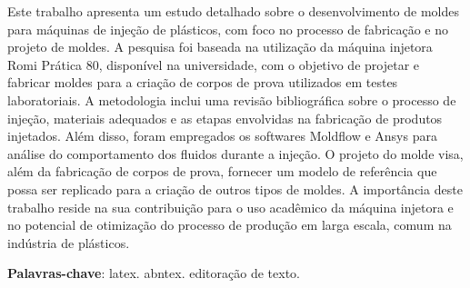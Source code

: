 \begin{resumo}
    Este trabalho apresenta um estudo detalhado sobre o desenvolvimento de moldes para máquinas de injeção de plásticos, com foco no processo de fabricação e no projeto de moldes. A pesquisa foi baseada na utilização da máquina injetora Romi Prática 80, disponível na universidade, com o objetivo de projetar e fabricar moldes para a criação de corpos de prova utilizados em testes laboratoriais. A metodologia inclui uma revisão bibliográfica sobre o processo de injeção, materiais adequados e as etapas envolvidas na fabricação de produtos injetados. Além disso, foram empregados os softwares Moldflow e Ansys para análise do comportamento dos fluidos durante a injeção. O projeto do molde visa, além da fabricação de corpos de prova, fornecer um modelo de referência que possa ser replicado para a criação de outros tipos de moldes. A importância deste trabalho reside na sua contribuição para o uso acadêmico da máquina injetora e no potencial de otimização do processo de produção em larga escala, comum na indústria de plásticos.

 \vspace{\onelineskip}
    
 \noindent
 \textbf{Palavras-chave}: latex. abntex. editoração de texto.
\end{resumo}
